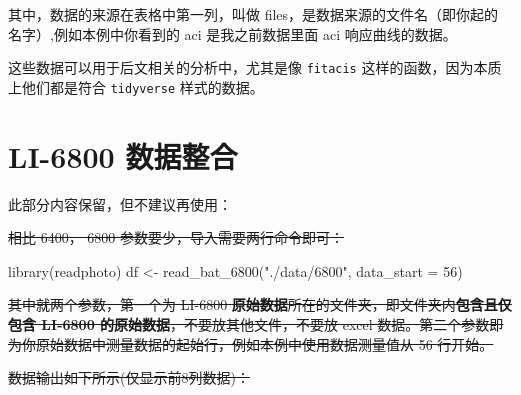 \documentclass[
]{krantz}
\makeatletter
\newenvironment{Shaded}{\begin{snugshade}}{\end{snugshade}}
\newcommand{\AttributeTok}[1]{\textcolor[rgb]{0.77,0.63,0.00}{#1}}
\newcommand{\DecValTok}[1]{\textcolor[rgb]{0.00,0.00,0.81}{#1}}
\newcommand{\FunctionTok}[1]{\textcolor[rgb]{0.00,0.00,0.00}{#1}}
\newcommand{\NormalTok}[1]{#1}
\newcommand{\OtherTok}[1]{\textcolor[rgb]{0.56,0.35,0.01}{#1}}
\newcommand{\StringTok}[1]{\textcolor[rgb]{0.31,0.60,0.02}{#1}}
\newenvironment{kframe}{%
\medskip{}
\setlength{\fboxsep}{.8em}
 \def\at@end@of@kframe{}%
 \ifinner\ifhmode%
  \def\at@end@of@kframe{\end{minipage}}%
  \begin{minipage}{\columnwidth}%
 \fi\fi%
 \def\FrameCommand##1{\hskip\@totalleftmargin \hskip-\fboxsep
 \colorbox{shadecolor}{##1}\hskip-\fboxsep
     \hskip-\linewidth \hskip-\@totalleftmargin \hskip\columnwidth}%
 \MakeFramed {\advance\hsize-\width
   \@totalleftmargin\z@ \linewidth\hsize
   \@setminipage}}%
 {\par\unskip\endMakeFramed%
 \at@end@of@kframe}
\renewenvironment{Shaded}{\begin{kframe}}{\end{kframe}}
\makeatother
\begin{document}
其中，数据的来源在表格中第一列，叫做 files，是数据来源的文件名（即你起的名字）,例如本例中你看到的 aci 是我之前数据里面 aci 响应曲线的数据。

这些数据可以用于后文相关的分析中，尤其是像 \texttt{fitacis} 这样的函数，因为本质上他们都是符合 \texttt{tidyverse} 样式的数据。

\hypertarget{batch68}{%
\section{LI-6800 数据整合}\label{batch68}}

此部分内容保留，但不建议再使用：

\sout{相比 6400， 6800 参数要少，导入需要两行命令即可：}

\begin{Shaded}
\begin{Highlighting}[]
\FunctionTok{library}\NormalTok{(readphoto)}
\NormalTok{df }\OtherTok{\textless{}{-}} \FunctionTok{read\_bat\_6800}\NormalTok{(}\StringTok{"./data/6800"}\NormalTok{, }\AttributeTok{data\_start =} \DecValTok{56}\NormalTok{)}
\end{Highlighting}
\end{Shaded}

\sout{其中就两个参数，第一个为 LI-6800 \textbf{原始数据}所在的文件夹，即文件夹内\textbf{包含且仅包含 LI-6800 的原始数据}，不要放其他文件，不要放 excel 数据。第二个参数即为你原始数据中测量数据的起始行，例如本例中使用数据测量值从 56 行开始。}

\sout{数据输出如下所示(仅显示前8列数据)：}
\end{document}
